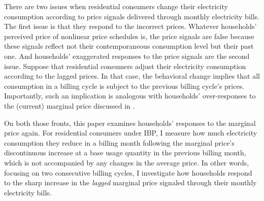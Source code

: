 There are two issues when residential consumers change their electricity consumption according to price signals delivered through monthly electricity bills. The first issue is that they respond to the incorrect prices. Whatever households' perceived price of nonlinear price schedules is, the price signals are false because these signals reflect not their contemporaneous consumption level but their past one. And households' exaggerated responses to the price signals are the second issue. Suppose that residential consumers adjust their electricity consumption according to the lagged prices. In that case, the behavioral change implies that all consumption in a billing cycle is subject to the previous billing cycle's prices. Importantly, such an implication is analogous with households' over-responses to the (current) marginal price discussed in \cite{Misunderstanding-Nonlinear-Prices_2020_(Shaffer)}. 

On both those fronts, this paper examines households' responses to the marginal price again. For residential consumers under IBP, I measure how much electricity consumption they reduce in a billing month following the marginal price's discontinuous increase at a base usage quantity in the previous billing month, which is not accompanied by any changes in the average price. In other words, focusing on two consecutive billing cycles, I investigate how households respond to the sharp increase in the \textit{lagged} marginal price signaled through their monthly electricity bills.

